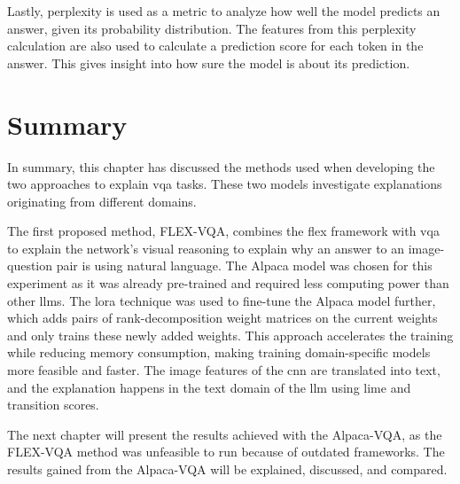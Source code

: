         Lastly, perplexity is used as a metric to analyze how well the model predicts an answer, given its probability distribution. 
        The features from this perplexity calculation are also used to calculate a prediction score for each token in the answer. This gives insight into how sure the model is about its prediction.
       
        

        

\section{Summary}

In summary, this chapter has discussed the methods used when developing the two approaches to explain \gls{vqa} tasks. These two models investigate explanations originating from different domains.


The first proposed method, FLEX-VQA, combines the \gls{flex} framework with \gls{vqa} to explain the network's visual reasoning to explain why an answer to an image-question pair is using natural language. 
The Alpaca model was chosen for this experiment as it was already pre-trained and required less computing power than other \glspl{llm}. The \gls{lora} technique was used to fine-tune the Alpaca model further, which adds pairs of rank-decomposition weight matrices on the current weights and only trains these newly added weights. This approach accelerates the training while reducing memory consumption, making training domain-specific models more feasible and faster.
The image features of the \gls{cnn} are translated into text, and the explanation happens in the text domain of the \gls{llm} using \gls{lime} and transition scores.


The next chapter will present the results achieved with the Alpaca-VQA, as the FLEX-VQA method was unfeasible to run because of outdated frameworks. 
The results gained from the Alpaca-VQA will be explained, discussed, and compared.